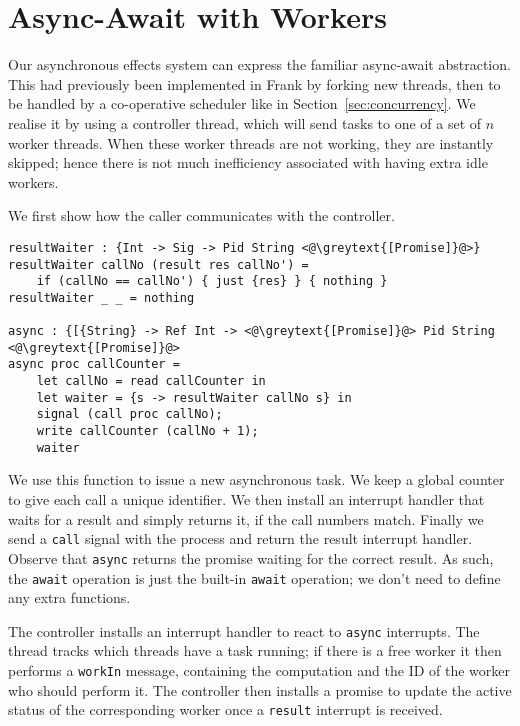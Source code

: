 \documentclass[msc,deptreport,cs]{infthesis} %
\newcommand{\code}[1]{\lstinline{#1}}
\newcommand{\greytext}[1]{\textcolor{black!40}{#1}}
\begin{document}
\section{Async-Await with Workers}
\label{sec:async-await}

Our asynchronous effects system can express the familiar async-await
abstraction. This had previously been implemented in Frank by forking new
threads, then to be handled by a co-operative scheduler like in
Section~\ref{sec:concurrency}. We realise it by using a controller thread, which
will send tasks to one of a set of $n$ worker threads. When these worker threads
are not working, they are instantly skipped; hence there is not much
inefficiency associated with having extra idle workers.

We first show how the caller communicates with the controller.

\begin{lstlisting}
resultWaiter : {Int -> Sig -> Pid String <@\greytext{[Promise]}@>}
resultWaiter callNo (result res callNo') =
    if (callNo == callNo') { just {res} } { nothing }
resultWaiter _ _ = nothing

async : {[{String} -> Ref Int -> <@\greytext{[Promise]}@> Pid String <@\greytext{[Promise]}@>
async proc callCounter =
    let callNo = read callCounter in
    let waiter = {s -> resultWaiter callNo s} in
    signal (call proc callNo);
    write callCounter (callNo + 1);
    waiter
\end{lstlisting}

We use this function to issue a new asynchronous task. We keep a global counter
to give each call a unique identifier. We then install an interrupt handler that
waits for a result and simply returns it, if the call numbers match. Finally we
send a \code{call} signal with the process and return the result interrupt
handler. Observe that \code{async} returns the promise waiting for the correct
result. As such, the \code{await} operation is just the built-in \code{await}
operation; we don't need to define any extra functions.

The controller installs an interrupt handler to react to \code{async}
interrupts. The thread tracks which threads have a task running; if there is a
free worker it then performs a \code{workIn} message, containing the computation
and the ID of the worker who should perform it. The controller then installs a
promise to update the active status of the corresponding worker once a
\code{result} interrupt is received.

\end{document}
